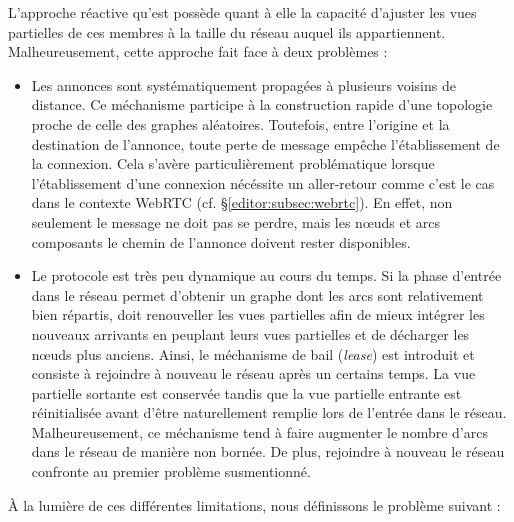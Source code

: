 L'approche réactive qu'est \SCAMP possède quant à elle la capacité d'ajuster les
vues partielles de ces membres à la taille du réseau auquel ils
appartiennent. Malheureusement, cette approche fait face à deux problèmes :
\begin{itemize}
\item Les annonces sont systématiquement propagées à plusieurs voisins de
  distance. Ce méchanisme participe à la construction rapide d'une topologie
  proche de celle des graphes aléatoires. Toutefois, entre l'origine et la
  destination de l'annonce, toute perte de message empêche l'établissement de la
  connexion. Cela s'avère particulièrement problématique lorsque l'établissement
  d'une connexion nécéssite un aller-retour comme c'est le cas dans le contexte
  WebRTC (cf. §\ref{editor:subsec:webrtc}). En effet, non seulement le message
  ne doit pas se perdre, mais les nœuds et arcs composants le chemin de
  l'annonce doivent rester disponibles.
\item Le protocole est très peu dynamique au cours du temps. Si la phase
  d'entrée dans le réseau permet d'obtenir un graphe dont les arcs sont
  relativement bien répartis, \SCAMP doit renouveller les vues partielles afin
  de mieux intégrer les nouveaux arrivants en peuplant leurs vues partielles et
  de décharger les nœuds plus anciens. Ainsi, le méchanisme de bail
  (\emph{lease}) est introduit et consiste à rejoindre à nouveau le réseau après
  un certains temps. La vue partielle sortante est conservée tandis que la vue
  partielle entrante est réinitialisée avant d'être naturellement remplie lors
  de l'entrée dans le réseau. Malheureusement, ce méchanisme tend à faire
  augmenter le nombre d'arcs dans le réseau de manière non bornée. De plus,
  rejoindre à nouveau le réseau confronte au premier problème susmentionné.
\end{itemize}
À la lumière de ces différentes limitations, nous définissons le problème
suivant :

